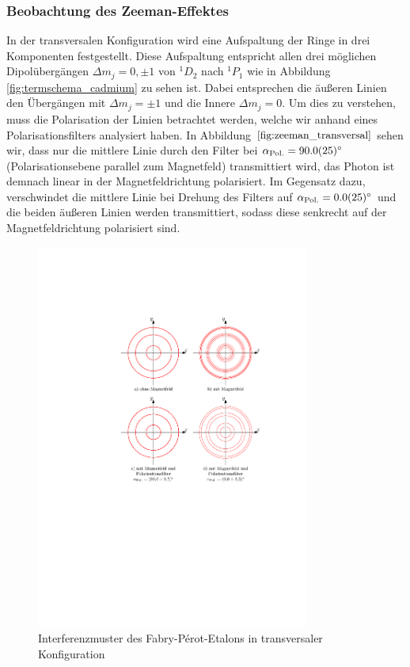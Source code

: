\documentclass[11pt, a4paper]{article}
\begin{document}
\subsubsection{Beobachtung des Zeeman-Effektes}
In der transversalen Konfiguration wird eine Aufspaltung der Ringe in drei Komponenten festgestellt.
Diese Aufspaltung entspricht allen drei möglichen Dipolübergängen $\Delta m_j = 0, \pm 1$ von $^1D_2$ nach $^1P_1$ wie in Abbildung \ref{fig:termschema_cadmium} zu sehen ist.
Dabei entsprechen die äußeren Linien den Übergängen mit $\Delta m_j = \pm 1$ und die Innere $\Delta m_j = 0$.
Um dies zu verstehen, muss die Polarisation der Linien betrachtet werden, welche wir anhand eines Polarisationsfilters analysiert haben.
In Abbildung $\ref{fig:zeeman_transversal}$ sehen wir, dass nur die mittlere Linie durch den Filter bei $\alpha_\mathrm{Pol.} = \SI{90 +- 2,5}{\degree}$ (Polarisationsebene parallel zum Magnetfeld) transmittiert wird,  das Photon ist demnach linear in der Magnetfeldrichtung polarisiert.
Im Gegensatz dazu, verschwindet die mittlere Linie bei Drehung des Filters auf $\alpha_\mathrm{Pol.} = \SI{0 +- 2,5}{\degree}$ und die beiden äußeren Linien werden transmittiert, sodass diese senkrecht auf der Magnetfeldrichtung polarisiert sind.
\begin{figure}[h]
	\centering
	\includegraphics[width=0.8\textwidth]{./figures/zeeman_transversal.pdf}
	\caption{Interferenzmuster des Fabry-Pérot-Etalons in transversaler Konfiguration}
	\label{fig:zeeman_transversal}
\end{figure}
\end{document}
